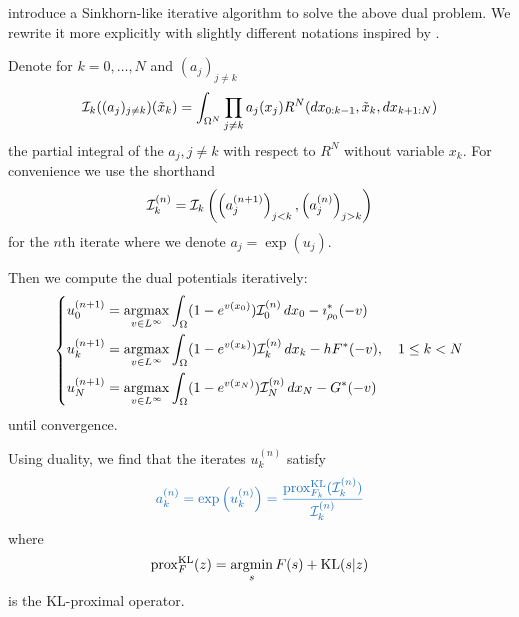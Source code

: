 \documentclass[../report.tex]{subfiles}
\begin{document}
\textcite{benamou2018entropy} introduce a Sinkhorn-like iterative algorithm to solve the above dual problem. We rewrite it more explicitly with slightly different notations inspired by \cite{chizat2016scaling}.

\begin{prop}\label{algo:Algo1}
	Denote for $k=0,\ldots,N$ and $(a_j)_{j\neq k}$
	\[
	\mathcal{I}_k((a_j)_{j\neq k})(\tilde{x}_k) = 
	\int_{\Omega^N}
	\prod_{j\neq k} a_j(x_j)
	R^N(dx_{0:k-1}, \tilde{x}_k, dx_{k+1:N})
	\]
	the partial integral of the $a_j,j\neq k$ with respect to $R^N$ without variable $x_k$.
	For convenience we use the shorthand
	\[
	\mathcal{I}_k^{(n)} = \mathcal{I}_k\left(\left(a^{(n+1)}_j\right)_{j<k},
	\left(a^{(n)}_j\right)_{j>k}\right)
	\]
	for the $n$th iterate where we denote $a_j = \exp(u_j)$.
	
	Then we compute the dual potentials iteratively:
	\begin{equation}
	\begin{dcases}
	u_0^{(n+1)} = \operatorname*{argmax}_{v \in L^\infty} \int_{\Omega} (1 - e^{v(x_0)}) \mathcal{I}_0^{(n)} \,dx_0 - \imath_{\rho_0}^*(-v) \\
	u_k^{(n+1)} = \operatorname*{argmax}_{v \in L^\infty} \int_{\Omega} (1- e^{v(x_k)}) \mathcal{I}_k^{(n)} \,dx_k - hF^*(-v) ,
	\quad 1\leq k < N  \\
	u_N^{(n+1)} = \operatorname*{argmax}_{v \in L^\infty} \int_{\Omega} (1 - e^{v(x_N)}) \mathcal{I}_N^{(n)} \,dx_N - G^*(-v)
	\end{dcases}
	\end{equation}
	until convergence.
	
	Using duality, we find that the iterates $u_k^{(n)}$ satisfy
	\begin{equation}
	{\bluefont
	a_k^{(n)} = \exp\left(u^{(n)}_k\right) =
	\frac{
		\prox_{F_k}^{\KL}(\calI_k^{(n)})
	}{\calI_k^{(n)}}}
	\end{equation}
	where
	\[
		\operatorname{prox}_F^{\operatorname{KL}}(z) = \operatorname*{argmin}_{s} F(s) + \operatorname{KL}(s|z)
	\]
	is the KL-proximal operator.
\end{prop}
\end{document}
